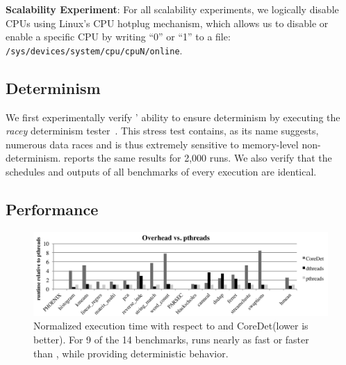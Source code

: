  
\textbf{Scalability Experiment}: For all scalability experiments, we logically disable CPUs using Linux's CPU hotplug mechanism, which allows us to disable or enable a specific CPU by writing ``0'' or ``1'' to a file: \texttt{/sys/devices/system/cpu/cpuN/online}.

\subsection{Determinism}

We first experimentally verify \dthreads{}' ability to ensure determinism by executing the \emph{racey} determinism tester~\cite{1508256}. This stress test contains, as its name suggests, numerous data races and is thus extremely sensitive to memory-level non-determinism. \dthreads{} reports the same results for 2,000 runs. We also verify that the schedules and outputs of all benchmarks of every execution are identical.

\subsection{Performance}
\label{sec:performance}

\begin{figure}[!t]
{\centering
\includegraphics[width=6in]{dthreads/figure/overhead-figure}
\caption{Normalized execution time with respect to \pthreads{} and CoreDet(lower is better). For 9 of the 14 benchmarks, \dthreads{} runs nearly as fast or faster than \pthreads{}, while providing deterministic behavior.\label{fig:performance}}
}
\end{figure}

